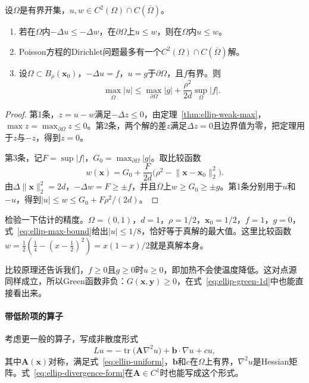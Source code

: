 \begin{theorem}[比较原理与上界]
\label{thm:ellip-comparison}
设$\Omega$是有界开集，$u,w\in C^2(\Omega)\cap C(\overline\Omega)$。
\begin{enumerate}
 \item 若在$\Omega$内$-\Delta u\leq-\Delta w$，在$\partial\Omega$上$u\leq w$，则在$\Omega$内$u\leq w$。
 \item Poisson方程的Dirichlet问题最多有一个$C^2(\Omega)\cap C(\overline\Omega)$解。
 \item 设$\Omega\subset B_\rho(\bm{x}_0)$，$-\Delta u=f$，$u=g$于$\partial\Omega$，且$f$有界。则
 \begin{equation}
 \max_{\overline\Omega}\lvert u\rvert\leq\max_{\partial\Omega}\lvert g\rvert+\frac{\rho^2}{2d}\sup_\Omega\lvert f\rvert .
 \label{eq:ellip-max-bound}
 \end{equation}
\end{enumerate}
\end{theorem}

\begin{proof}
第1条，$z=u-w$满足$-\Delta z\leq0$，由定理~\ref{thm:ellip-weak-max}，$\max z=\max_{\partial\Omega}z\leq0$。第2条，两个解的差$z$满足$\Delta z=0$且边界值为零，把定理用于$z$与$-z$，得到$z=0$。

第3条，记$F=\sup\lvert f\rvert$，$G_0=\max_{\partial\Omega}\lvert g\rvert$。取比较函数
\[
 w(\bm{x})=G_0+\frac F{2d}\bigl(\rho^2-\lVert\bm{x}-\bm{x}_0\rVert_2^2\bigr).
\]
由$\Delta\lVert\bm{x}\rVert_2^2=2d$，$-\Delta w=F\geq\pm f$，并且$\overline\Omega$上$w\geq G_0\geq\pm g$。第1条分别用于$u$和$-u$，得到$\lvert u\rvert\leq w\leq G_0+F\rho^2/(2d)$。
\end{proof}

检验一下估计的精度。$\Omega=(0,1)$，$d=1$，$\rho=1/2$，$\bm{x}_0=1/2$，$f=1$，$g=0$，式~\eqref{eq:ellip-max-bound}给出$\lvert u\rvert\leq1/8$，恰好等于真解的最大值。这里比较函数$w=\frac12(\frac14-(x-\frac12)^2)=x(1-x)/2$就是真解本身。

比较原理还告诉我们，$f\geq0$且$g\geq0$时$u\geq0$，即加热不会使温度降低。这对点源同样成立，所以Green函数非负：$G(\bm{x},\bm{y})\geq0$，在式~\eqref{eq:ellip-green-1d}中也能直接看出来。

\paragraph{带低阶项的算子}
考虑更一般的算子，写成非散度形式
\begin{equation}
 Lu=-\operatorname{tr}\bigl(\bm{A}\nabla^2u\bigr)+\bm{b}\cdot\nabla u+cu,
 \label{eq:ellip-general-operator}
\end{equation}
其中$\bm{A}(\bm{x})$对称，满足式~\eqref{eq:ellip-uniform}，$\bm{b}$和$c$在$\Omega$上有界，$\nabla^2u$是Hessian矩阵。式~\eqref{eq:ellip-divergence-form}在$\bm{A}\in C^1$时也能写成这个形式。


